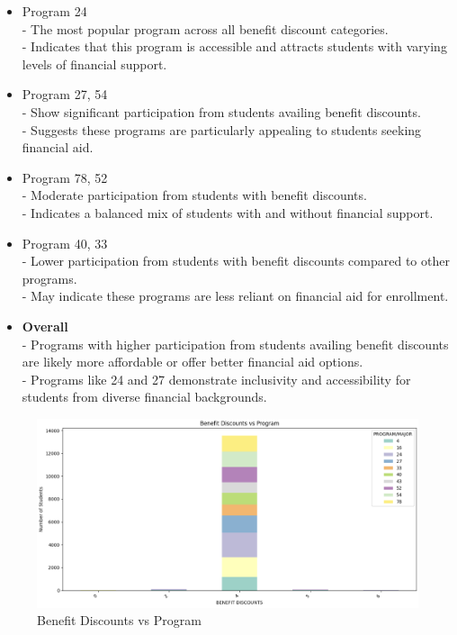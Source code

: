 \documentclass[12pt]{article}
\begin{document}
\begin{itemize}
    \item Program 24\\
    - The most popular program across all benefit discount categories.\\
    - Indicates that this program is accessible and attracts students with varying levels of financial support.

    \item Program 27, 54\\
    - Show significant participation from students availing benefit discounts.\\
    - Suggests these programs are particularly appealing to students seeking financial aid.

    \item Program 78, 52\\
    - Moderate participation from students with benefit discounts.\\
    - Indicates a balanced mix of students with and without financial support.

    \item Program 40, 33\\
    - Lower participation from students with benefit discounts compared to other programs.\\
    - May indicate these programs are less reliant on financial aid for enrollment.

    \item \textbf{Overall}\\
    - Programs with higher participation from students availing benefit discounts are likely more affordable or offer better financial aid options.\\
    - Programs like 24 and 27 demonstrate inclusivity and accessibility for students from diverse financial backgrounds.
\end{itemize}

\begin{figure}[H]
    \centering
    \includegraphics[width=1\linewidth]{benefit_discounts.png}
    \caption{Benefit Discounts vs Program}
\end{figure}
\end{document}
